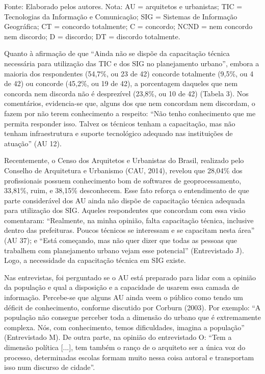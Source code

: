 \documentclass{article}
\begin{document}
Fonte: Elaborado pelos autores. Nota: AU = arquitetos e urbanistas;
TIC = Tecnologias da Informação e Comunicação; SIG = Sistemas de
Informação Geográfica; CT = concordo totalmente; C = concordo; NCND
= nem concordo nem discordo; D = discordo; DT = discordo
totalmente.

Quanto à afirmação de que “Ainda não se dispõe da capacitação técnica
necessária para utilização das TIC e dos SIG no planejamento
urbano”, embora a maioria dos respondentes (54,7\%, ou 23 de 42)
concorde totalmente (9,5\%, ou 4 de 42) ou concorde (45,2\%, ou 19 de 42), a
porcentagem daqueles que nem concorda nem discorda não é desprezível (23,8\%, ou
10 de 42) (Tabela 3). Nos comentários,
evidencia-se que, alguns dos que nem concordam nem discordam, o fazem por não
terem conhecimento a respeito: “Não tenho conhecimento que me permita
responder isso. Talvez os técnicos tenham a capacitação, mas não tenham
infraestrutura e suporte tecnológico adequado nas instituições de
atuação” (AU 12).

Recentemente, o Censo dos Arquitetos e Urbanistas do Brasil, realizado pelo
Conselho de Arquitetura e Urbanismo (CAU,
2014), revelou que 28,04\% dos profissionais possuem conhecimento bom
de softwares de geoprocessamento, 33,81\%, ruim, e 38,15\%
desconhecem. Esse fato reforça o entendimento de que parte considerável dos AU
ainda não dispõe de capacitação técnica adequada para utilização dos SIG.
Aqueles respondentes que concordam com essa visão comentaram:
“Realmente, na minha opinião, falta capacitação técnica, inclusive
dentro das prefeituras. Poucos técnicos se interessam e se capacitam nesta
área” (AU 37); e “Está começando, mas não quer dizer que
todas as pessoas que trabalhem com planejamento urbano vejam esse
potencial” (Entrevistado J). Logo, a necessidade da capacitação
técnica em SIG existe.

Nas entrevistas, foi perguntado se o AU está preparado para lidar com a opinião
da população e qual a disposição e a capacidade de usarem essa camada de
informação. Percebe-se que alguns AU ainda veem o público como tendo um déficit
de conhecimento, conforme discutido por Corburn
(2003). Por exemplo: “A população não consegue perceber toda
a dimensão do urbano que é extremamente complexa. Nós, com conhecimento,
temos dificuldades, imagina a população” (Entrevistado M). De outra
parte, na opinião do entrevistado O: “Tem a dimensão política
[...], tem também o ranço de o arquiteto ser a única voz do processo,
determinadas escolas formam muito nessa coisa autoral e transportam isso num
discurso de cidade”.
\end{document}
